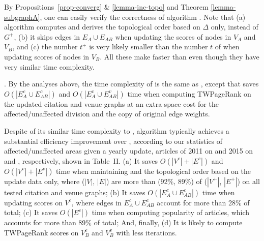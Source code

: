 
By Propositions~\ref{prop-converg} \& \ref{lemma-inc-topo} and Theorem \ref{lemma-subgraphA}, one can easily verify the correctness of algorithm \inctwprscc.
%
Note that  (a) algorithm \inctwprscc computes \sccs and derives the topological order based  on $\Delta$ only, instead of $G^{+}$,
(b) it skips edges in $E_A\cup E_{AB}$ when updating the scores of nodes in $V_A$ and $V_B$, and
(c) the number $t^+$ is very likely smaller than the number $t$ of \twprscc when updating scores of nodes in $V_B$.
%
All these make \inctwprscc faster than \twprscc even though they have very similar time complexity.


.
By the analyses above, the time complexity of \incensemble is the same as \batensemble, except that \incensemble saves $O(|E^c_A\cup E^c_{AB}|)$ and $O(|E^v_A\cup E^v_{AB}|)$ time when computing TWPageRank  on the updated citation and venue graphs at an extra space cost for the affected/unaffected division and the copy of original edge weights.


Despite of its similar time complexity to \batensemble, algorithm \incensemble typically achieves a substantial efficiency improvement over \batensemble, according to our statistics of affected/unaffected areas given a yearly update, \ie articles of 2011 on \aan and 2015 on \aminer and \magdata, respectively, shown in Table~II.
%
(a) It saves $O(|V^c|+|E^c|)$ and $O(|V^v|+|E^v|)$ time when maintaining \sccs and the topological order based on the update data only, 
where ($|V|$, $|E|$) are more than (92\%, 89\%) of ($|V^{+}|$, $|E^{+}|$) on all tested citation and venue graphs;
(b) It saves $O(|E^c_A \cup E^c_{AB}|)$ time when updating scores on $V^c$, where edges in $E^c_A\cup E^c_{AB}$ account for more than 28\% of total;
(c) It saves $O(|E^c|)$ time when computing popularity of articles, which accounts for more than 89\% of total;
And, finally, (d) It is likely to compute TWPageRank scores on $V^c_B$ and $V^v_B$ with less iterations.



